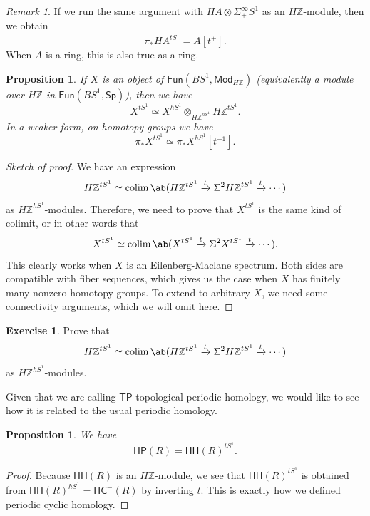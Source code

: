 \documentclass[10pt, oneside]{memoir}
\newtheorem{prop}[thm]{Proposition}
\theoremstyle{definition}
\newtheorem{exer}[thm]{Exercise}
\theoremstyle{remark}
\newtheorem{rmk}[thm]{Remark}
\theoremstyle{plain}
\theoremstyle{definition}
\theoremstyle{remark}
\newcommand{\Z}{\mathbb{Z}}
\newcommand{\ms}[1]{\mathsf{#1}}
\newcommand{\1}{\mathbf{1}}
\newcommand{\2}{\mathbf{2}}
\newcommand{\3}{\mathbf{3}}
\newcommand{\HC}{\ms{HC}}
\newcommand{\TP}{\ms{TP}}
\newcommand{\HH}{\ms{HH}}
\newcommand{\HP}{\ms{HP}}
\DeclareMathOperator*{\colim}{colim}
\begin{document}
\begin{rmk}
    If we run the same argument with \(HA \otimes \Sigma_+^{\infty} S^1 \) as an \(H\Z \)-module, then we obtain
    \[ \pi_* HA^{t S^1} = A[t^{\pm}]. \]
    When \(A \) is a ring, this is also true as a ring.
\end{rmk}

\begin{prop}
    If \(X \) is an object of \(\ms{Fun}(BS^1, \ms{Mod}_{H\Z}) \) (equivalently a module over \(H\Z \) in \(\ms{Fun}(BS^1, \ms{Sp}) \)), then we have
    \[ X^{t S^1} \simeq X^{hS^1} \otimes_{H\Z^{hS^1}} H\Z^{tS^1}. \]
    In a weaker form, on homotopy groups we have
    \[ \pi_* X^{tS^1} \simeq \pi_* X^{hS^1}[t^{-1}]. \]
\end{prop}

\begin{proof}[Sketch of proof]
    We have an expression
    \[ H\Z^{tS^1} \simeq \colim \ab(H\Z^{tS^1} \xrightarrow{t} \Sigma^2 H\Z^{tS^1} \xrightarrow{t} \cdots) \]
    as \(H\Z^{hS^1} \)-modules. Therefore, we need to prove that \(X^{tS^1} \) is the same kind of colimit, or in other words that
    \[ X^{tS^1} \simeq \colim \ab(X^{tS^1} \xrightarrow{t} \Sigma^2 X^{tS^1} \xrightarrow{t} \cdots). \]
    This clearly works when \(X \) is an Eilenberg-Maclane spectrum. Both sides are compatible with fiber sequences, which gives us the case when \(X \) has finitely many nonzero homotopy groups. To extend to arbitrary \(X \), we need some connectivity arguments, which we will omit here.
\end{proof}

\begin{exer}
    Prove that
    \[ H\Z^{tS^1} \simeq \colim \ab(H\Z^{tS^1} \xrightarrow{t} \Sigma^2 H\Z^{tS^1} \xrightarrow{t} \cdots) \]
    as \(H\Z^{hS^1} \)-modules.
\end{exer}

Given that we are calling \(\TP \) topological periodic homology, we would like to see how it is related to the usual periodic homology.

\begin{prop}
    We have
    \[ \HP(R) = \HH(R)^{tS^1}. \]
\end{prop}

\begin{proof}
    Because \(\HH(R) \) is an \(H\Z \)-module, we see that \(\HH(R)^{tS^1} \) is obtained from \(\HH(R)^{hS^1} = \HC^-(R) \) by inverting \(t \). This is exactly how we defined periodic cyclic homology.
\end{proof}
\end{document}
